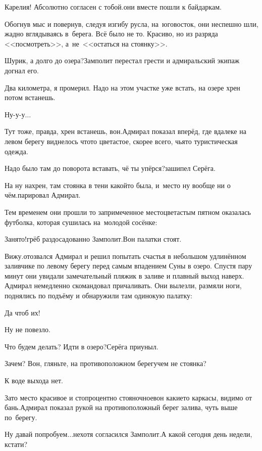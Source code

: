 \diagdash Карелия! Абсолютно согласен с тобой.\mdash они вместе пошли к байдаркам.

Обогнув мыс и повернув, следуя изгибу русла, на~юго\sdash восток, они неспешно шли, жадно вглядываясь в~берега. Всё было не то. Красиво, но из разряда <<посмотреть>>, а~не~<<остаться на стоянку>>.

\diagdash Шурик, а долго до озера?\mdash Замполит перестал грести и адмиральский экипаж догнал его.

\diagdash Два километра, я промерил. Надо на этом участке уже встать, на озере хрен потом встанешь.

\diagdash Ну-у-у$\ldots$

\diagdash Тут тоже, правда, хрен встанешь, вон.\mdash Адмирал показал вперёд, где вдалеке на левом берегу виднелось что\sdash то цветастое, скорее всего, чья\sdash то туристическая одежда. 

\diagdash Надо было там до поворота вставать, чё ты упёрся?\mdash зашипел Серёга.

\diagdash На ну нахрен, там стоянка в тени какой\sdash то была, и~место ну вообще ни о чём.\mdash парировал Адмирал.

Тем временем они прошли то запримеченное место\mdash цветастым пятном оказалась футболка, которая сушилась на~молодой сосёнке:

\diagdash Занято!\mdash грёб раздосадованно Замполит.\mdash Вон палатки стоят.

\diagdash Вижу.\mdash отозвался Адмирал и решил попытать счастья в небольшом удлинённом заливчике по левому берегу перед самым впадением Суны в озеро. Спустя пару минут они увидали замечательный пляжик в заливе и плавный выход наверх. Адмирал немедленно скомандовал причаливать. Они вылезли, размяли ноги, поднялись по подъёму и обнаружили там одинокую палатку:

\diagdash Да чтоб их!

\diagdash Ну не повезло.

\diagdash Что будем делать? Идти в озеро?\mdash Серёга приуныл.

\diagdash Зачем? Вон, гляньте, на противоположном берегу\mdash чем не стоянка? 

\diagdash К воде выхода нет.

\diagdash Зато место красивое и стопроцентно стояночное\mdash вон какие\sdash то каркасы, видимо от бань.\mdash Адмирал показал рукой на противоположный берег залива, чуть выше по~берегу.

\diagdash Ну давай попробуем$\ldots$\mdash нехотя согласился Замполит.\mdash А какой сегодня день недели, кстати?

